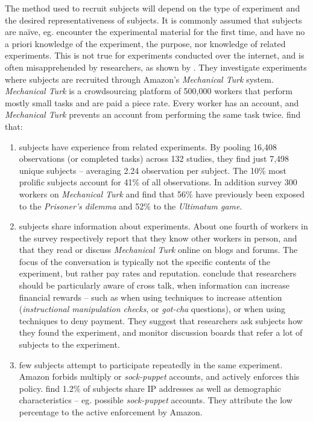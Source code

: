 \documentclass[preprint, 12pt]{elsarticle}
\begin{document}
The method used to recruit subjects will depend on the type of experiment and the desired representativeness of subjects. It is commonly assumed that subjects are naïve, eg. encounter the experimental material for the first time, and have no a priori knowledge of the experiment, the purpose, nor knowledge of related experiments. This is not true for experiments conducted over the internet, and is often misapprehended by researchers, as shown by \citet*{Chandler_Mueller_Paolacci_2014}. They investigate experiments where subjects are recruited through Amazon's \emph{Mechanical Turk} system. \emph{Mechanical Turk} is a crowdsourcing platform of 500,000 workers that perform mostly small tasks and are paid a piece rate. Every worker has an account, and \emph{Mechanical Turk} prevents an account from performing the same task twice. \cite{Chandler_Mueller_Paolacci_2014} find that: 

\begin{enumerate}
\item subjects have experience from related experiments. By pooling 16,408 observations (or completed tasks) across 132 studies, they find just 7,498 unique subjects -- averaging 2.24 observation per subject. The 10\% most prolific subjects account for 41\% of all observations. In addition \cite{Chandler_Mueller_Paolacci_2014} survey 300 workers on \emph{Mechanical Turk} and find that 56\% have previously been exposed to the \emph{Prisoner's dilemma} and 52\% to the \emph{Ultimatum game}. 
\item subjects share information about experiments. About one fourth of workers in the \cite{Chandler_Mueller_Paolacci_2014} survey respectively report that they know other workers in person, and that they read or discuss \emph{Mechanical Turk} online on blogs and forums. The focus of the conversation is typically not the specific contents of the experiment, but rather pay rates and reputation. \cite{Chandler_Mueller_Paolacci_2014} conclude that researchers should be particularly aware of cross talk, when information can increase financial rewards -- such as when using techniques to increase attention (\emph{instructional manipulation checks}, or \emph{got-cha} questions), or when using techniques to deny payment. They suggest that researchers ask subjects how they found the experiment, and monitor discussion boards that refer a lot of subjects to the experiment.
\item few subjects attempt to participate repeatedly in the same experiment. Amazon forbids multiply or \emph{sock-puppet} accounts, and actively enforces this policy. \cite{Chandler_Mueller_Paolacci_2014} find 1.2\% of subjects share IP addresses as well as demographic characteristics -- eg. possible \emph{sock-puppet} accounts. They attribute the low percentage to the active enforcement by Amazon.
\end{enumerate}
\end{document}
